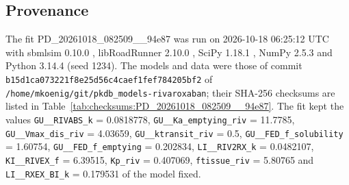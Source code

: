 \subsection{Provenance}

The fit PD\_20261018\_082509\_\_94e87 was run on 2026-10-18 06:25:12 UTC with sbmlsim 0.10.0 \cite{Koenig2026_sbmlsim}, libRoadRunner 2.10.0 \cite{Welsh2023}, SciPy 1.18.1 \cite{Virtanen2020}, NumPy 2.5.3 \cite{Harris2020} and Python 3.14.4 (seed 1234). The models and data were those of commit \texttt{b15d1ca073221f8e25d56c4caef1fef784205bf2} of \texttt{/home/mkoenig/git/pkdb\_models-rivaroxaban}; their SHA-256 checksums are listed in Table~\ref{tab:checksums:PD_20261018_082509__94e87}. The fit kept the values \texttt{GU\_\_RIVABS\_k} = 0.0818778, \texttt{GU\_\_Ka\_emptying\_riv} = 11.7785, \texttt{GU\_\_Vmax\_dis\_riv} = 4.03659, \texttt{GU\_\_ktransit\_riv} = 0.5, \texttt{GU\_\_FED\_f\_solubility} = 1.60754, \texttt{GU\_\_FED\_f\_emptying} = 0.202834, \texttt{LI\_\_RIV2RX\_k} = 0.0482107, \texttt{KI\_\_RIVEX\_f} = 6.39515, \texttt{Kp\_riv} = 0.407069, \texttt{ftissue\_riv} = 5.80765 and \texttt{LI\_\_RXEX\_BI\_k} = 0.179531 of the model fixed.

